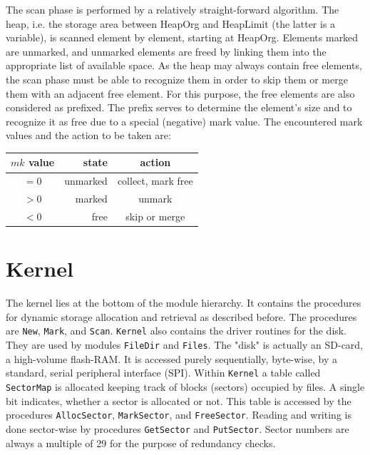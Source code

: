 The scan phase is performed by a relatively straight-forward algorithm. The heap, i.e. the storage
area between HeapOrg and HeapLimit (the latter is a variable), is scanned element by element,
starting at HeapOrg. Elements marked are unmarked, and unmarked elements are freed by linking
them into the appropriate list of available space.
As the heap may always contain free elements, the scan phase must be able to recognize them in
order to skip them or merge them with an adjacent free element. For this purpose, the free
elements are also considered as prefixed. The prefix serves to determine the element's size and to
recognize it as free due to a special (negative) mark value. The encountered mark values and the
action to be taken are:
\begin{table}[h!]
  \centering
  \begin{tabular}{c r c}
    $mk$ value &  state & action \\\hline
    $=0$     & unmarked & collect, mark free \\
    $>0$     &   marked & unmark \\
    $<0$     &     free & skip or merge
  \end{tabular}
\end{table}

\section{Kernel}
\label{sec:kernel}
The kernel lies at the bottom of the module hierarchy. It contains the procedures for
dynamic storage allocation and retrieval as described before. The procedures are \verb|New|,
\verb|Mark|, and \verb|Scan|. \verb|Kernel| also contains the driver routines for the disk.
They are used by modules \verb|FileDir| and \verb|Files|. The "disk" is actually an SD-card,
a high-volume flash-RAM. It is accessed purely sequentially, byte-wise, by a standard,
serial peripheral interface (SPI). Within \verb|Kernel| a table called \verb|SectorMap| is
allocated keeping track of blocks (sectors) occupied by files. A single bit indicates,
whether a sector is allocated or not. This table is accessed by the procedures
\verb|AllocSector|, \verb|MarkSector|, and \verb|FreeSector|. Reading and writing is done
sector-wise by procedures \verb|GetSector| and \verb|PutSector|. Sector numbers are always
a multiple of 29 for the purpose of redundancy checks.

